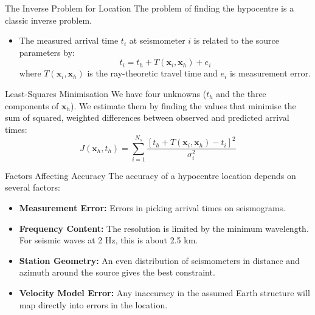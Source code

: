 \documentclass{beamer}
\begin{document}
\begin{frame}{The Inverse Problem for Location}
    The problem of finding the hypocentre is a classic inverse problem.
    \begin{itemize}
        \item The measured arrival time $ t_i $ at seismometer $i$ is related to the source parameters by:
        $$ t_{i}=t_{h}+T(\mathbf{x}_{i},\mathbf{x}_{h})+e_{i} $$
        where $T(\mathbf{x}_{i},\mathbf{x}_{h})$ is the ray-theoretic travel time and $e_i$ is measurement error.
    \end{itemize}
    \pause
    \begin{alertblock}{Least-Squares Minimisation}
        We have four unknowns ($t_h$ and the three components of $\mathbf{x}_h$). We estimate them by finding the values that minimise the sum of squared, weighted differences between observed and predicted arrival times:
        $$ J(\mathbf{x}_h, t_h) = \sum_{i=1}^{N_s} \frac{[t_h + T(\mathbf{x}_i, \mathbf{x}_h) - t_i]^2}{\sigma_i^2} $$
    \end{alertblock}
\end{frame}

\begin{frame}{Factors Affecting Accuracy}
    The accuracy of a hypocentre location depends on several factors:
    \begin{itemize}
        \item \textbf{Measurement Error:} Errors in picking arrival times on seismograms.
        \pause
        \item \textbf{Frequency Content:} The resolution is limited by the minimum wavelength. For seismic waves at 2 Hz, this is about 2.5 km.
        \pause
        \item \textbf{Station Geometry:} An even distribution of seismometers in distance and azimuth around the source gives the best constraint.
        \pause
        \item \textbf{Velocity Model Error:} Any inaccuracy in the assumed Earth structure will map directly into errors in the location.
    \end{itemize}
\end{frame}

\end{document}
